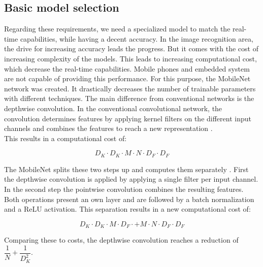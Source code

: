 \subsection{Basic model selection}\label{subsec:basic_model_selection}

Regarding these requirements, we need a specialized model to match the real-time capabilities, while having a decent accuracy. In the image recognition area, the drive for increasing accuracy leads the progress. But it comes with the cost of increasing complexity of the models. This leads to increasing computational cost, which decrease the real-time capabilities. Mobile phones and embedded system are not capable of providing this performance. For this purpose, the MobileNet \cite{tim1} network was created. It drastically decreases the number of trainable parameters with different techniques. The main difference from conventional networks is the depthwise convolution. In the conventional convolutional network, the convolution determines features by applying kernel filters on the different input channels and combines the features to reach a new representation \cite{tim1}.\\

This results in a computational cost of:

$$ D_K \cdot D_K \cdot M \cdot N \cdot D_F \cdot D_F$$

The MobileNet splits these two steps up and computes them separately \cite{tim2,tim3}.  First the depthwise convolution is applied by applying a single filter per input channel. In the second step the pointwise convolution combines the resulting features. Both operations present an own layer and are followed by a batch normalization and a ReLU activation. This separation results in a new computational cost of:

$$ D_K \cdot D_K \cdot M \cdot D_F \cdot + M \cdot N \cdot D_F \cdot D_F $$

Comparing these to costs, the depthwise convolution reaches a reduction of $ \dfrac{1}{N} + \dfrac{1}{D^2_K} $.

